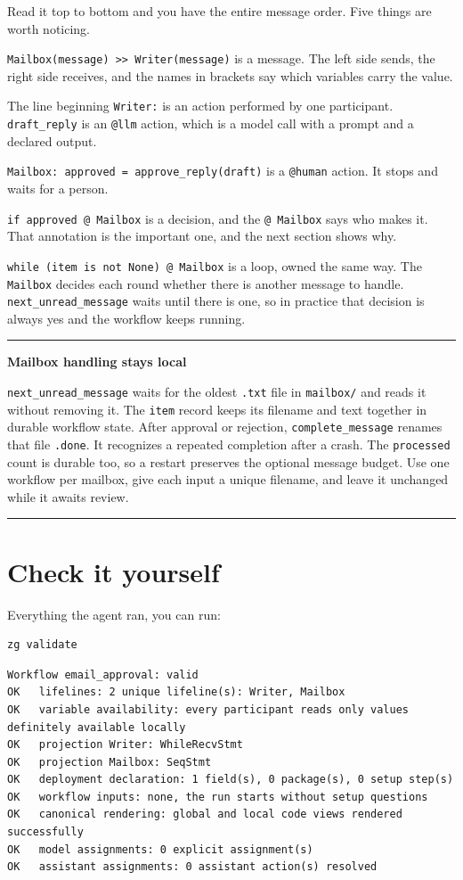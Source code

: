 \documentclass[11pt,a4paper]{article}
\newenvironment{notebox}[1]
{\begin{center}\begin{minipage}{0.94\linewidth}
 \color{ZipperInk}\hrule\vspace{5pt}\textbf{#1}\par\smallskip}
{\vspace{5pt}\hrule\end{minipage}\end{center}}
\begin{document}
Read it top to bottom and you have the entire message order. Five things are
worth noticing.

\texttt{Mailbox(message) >> Writer(message)} is a message. The left side sends,
the right side receives, and the names in brackets say which variables carry
the value.

The line beginning \texttt{Writer:} is an action performed by one participant.
\texttt{draft\_reply} is an \texttt{@llm} action, which is a model call with a
prompt and a declared output.

\texttt{Mailbox: approved = approve\_reply(draft)} is a \texttt{@human} action. It
stops and waits for a person.

\texttt{if approved @ Mailbox} is a decision, and the \texttt{@ Mailbox} says who
makes it. That annotation is the important one, and the next section shows why.

\texttt{while (item is not None) @ Mailbox} is a loop, owned the same way. The
\texttt{Mailbox} decides each round whether there is another message to handle.
\texttt{next\_unread\_message} waits until there is one, so in practice that
decision is always yes and the workflow keeps running.

\begin{notebox}{Mailbox handling stays local}
\texttt{next\_unread\_message} waits for the oldest \texttt{.txt} file in
\texttt{mailbox/} and reads it without removing it. The \texttt{item} record
keeps its filename and text together in durable workflow state.
After approval or rejection, \texttt{complete\_message} renames that file
\texttt{.done}. It recognizes a repeated completion after a crash.
The \texttt{processed} count is durable too, so a restart preserves the
optional message budget. Use one workflow per mailbox, give each input a unique
filename, and leave it unchanged while it awaits review.
\end{notebox}

\section{Check it yourself}

Everything the agent ran, you can run:

\begin{lstlisting}[style=shell]
zg validate
\end{lstlisting}

\begin{lstlisting}
Workflow email_approval: valid
OK   lifelines: 2 unique lifeline(s): Writer, Mailbox
OK   variable availability: every participant reads only values definitely available locally
OK   projection Writer: WhileRecvStmt
OK   projection Mailbox: SeqStmt
OK   deployment declaration: 1 field(s), 0 package(s), 0 setup step(s)
OK   workflow inputs: none, the run starts without setup questions
OK   canonical rendering: global and local code views rendered successfully
OK   model assignments: 0 explicit assignment(s)
OK   assistant assignments: 0 assistant action(s) resolved
\end{lstlisting}
\end{document}
